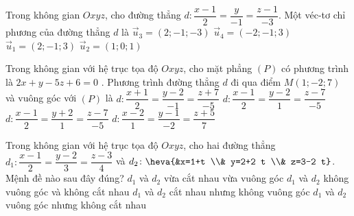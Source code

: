 \begin{ex}%
	Trong không gian $Oxyz$, cho đường thẳng $d\colon \dfrac{x-1}{2}=\dfrac{y}{-1}=\dfrac{z-1}{-3}$. Một véc-tơ chỉ phương của đường thẳng $d$ là
	\choice
	{\True $\overrightarrow{u}_3=(2 ; -1 ; -3)$}
	{$\overrightarrow{u}_4=(-2 ;-1 ; 3)$}
	{$\overrightarrow{u}_1=(2 ;-1 ; 3)$}
	{ $\overrightarrow{u}_2=(1 ; 0 ; 1)$}
\end{ex}

\begin{ex}%
	Trong không gian với hệ trục tọa độ $O x y z$, cho mặt phẳng $(P)$ có phương trình là $2 x+y-5 z+6=0$ . Phương trình đường thẳng $d$ đi qua điểm $M(1 ;-2 ; 7)$ và  vuông góc với $(P)$ là
	\choice
	{$d\colon  \dfrac{x+1}{2}=\dfrac{y-2}{-1}=\dfrac{z+7}{-5}$}
	{$d\colon  \dfrac{x-1}{2}=\dfrac{y-2}{1}=\dfrac{z-7}{-5}$}
	{\True $d\colon  \dfrac{x-1}{2}=\dfrac{y+2}{1}=\dfrac{z-7}{-5}$}
	{$d\colon  \dfrac{x-2}{1}=\dfrac{y-1}{-2}=\dfrac{z+5}{7}$}
\end{ex}

\begin{ex}%
	Trong không gian với hệ trục tọa độ $O x y z$, cho hai đường thẳng $d_1\colon \dfrac{x-1}{2}=\dfrac{y-2}{3}=\dfrac{z-3}{4}$ và $d_2\colon\heva{&x=1+t \\& y=2+2 t \\& z=3-2 t}$. Mệnh đề nào sau đây đúng?
	\choice
	{\True $d_1$ và $d_2$  vừa cắt nhau vừa vuông góc}
	{$d_1$ và $d_2$ không vuông góc và không cắt nhau}
	{$d_1$ và $d_2$ cắt nhau nhưng không vuông góc}
	{$d_1$ và $d_2$ vuông góc nhưng không cắt nhau}
\end{ex}


